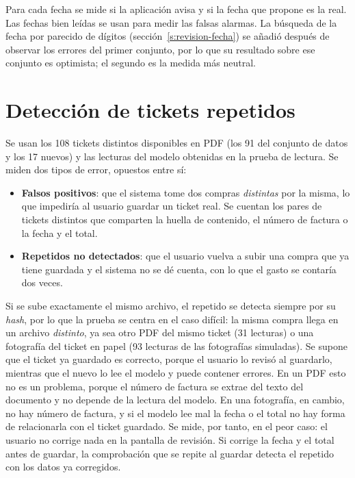 Para cada fecha se mide si la aplicación avisa y si la fecha que propone es la real. Las fechas bien leídas se usan para medir las falsas alarmas. La búsqueda de la fecha por parecido de dígitos (sección~\ref{s:revision-fecha}) se añadió después de observar los errores del primer conjunto, por lo que su resultado sobre ese conjunto es optimista; el segundo es la medida más neutral.

\section{Detección de tickets repetidos}
\label{s:val-repetidos}
Se usan los 108 tickets distintos disponibles en PDF (los 91 del conjunto de datos y los 17 nuevos) y las lecturas del modelo obtenidas en la prueba de lectura. Se miden dos tipos de error, opuestos entre sí:

\begin{itemize}
    \item \textbf{Falsos positivos}: que el sistema tome dos compras \emph{distintas} por la misma, lo que impediría al usuario guardar un ticket real. Se cuentan los pares de tickets distintos que comparten la huella de contenido, el número de factura o la fecha y el total.
    \item \textbf{Repetidos no detectados}: que el usuario vuelva a subir una compra que ya tiene guardada y el sistema no se dé cuenta, con lo que el gasto se contaría dos veces.
\end{itemize}

Si se sube exactamente el mismo archivo, el repetido se detecta siempre por su \textit{hash}, por lo que la prueba se centra en el caso difícil: la misma compra llega en un archivo \emph{distinto}, ya sea otro PDF del mismo ticket (31 lecturas) o una fotografía del ticket en papel (93 lecturas de las fotografías simuladas). Se supone que el ticket ya guardado es correcto, porque el usuario lo revisó al guardarlo, mientras que el nuevo lo lee el modelo y puede contener errores. En un PDF esto no es un problema, porque el número de factura se extrae del texto del documento y no depende de la lectura del modelo. En una fotografía, en cambio, no hay número de factura, y si el modelo lee mal la fecha o el total no hay forma de relacionarla con el ticket guardado. Se mide, por tanto, en el peor caso: el usuario no corrige nada en la pantalla de revisión. Si corrige la fecha y el total antes de guardar, la comprobación que se repite al guardar detecta el repetido con los datos ya corregidos.

